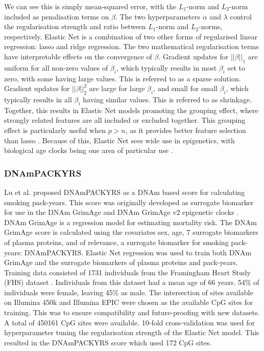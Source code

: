 \documentclass[draft]{article} %
\begin{document}
We can see this is simply mean-squared error, with the \(L_1\)-norm and \(L_2\)-norm included as penalisation terms on \(\beta\). The two hyperparameters \(\alpha\) and \(\lambda\) control the regularisation strength and ratio between \(L_1\)-norm and \(L_2\)-norms, respectively. Elastic Net is a combination of two other forms of regularised linear regression: lasso \cite{tibshirani1996regression} and ridge \cite{hoerl1970ridge} regression. The two mathematical regularisation terms have interpretable effects on the convergence of \(\beta\). Gradient updates for \(||\beta||_1\) are uniform for all non-zero values of \(\beta_i\), which typically results in most \(\beta_i\) set to zero, with some having large values. This is referred to as a sparse solution. Gradient updates for \(||\beta||_2^2\) are large for large \(\beta_i\), and small for small \(\beta_i\), which typically results in all \(\beta_i\) having similar values. This is referred to as shrinkage. Together, this results in Elastic Net models promoting the grouping effect, where strongly related features are all included or excluded together. This grouping effect is particularly useful when \(p > n\), as it provides better feature selection than lasso \cite{zou2005regularization}. Because of this, Elastic Net sees wide use in epigenetics, with biological age clocks being one area of particular use \cite{teschendorff2025epigenetic}.

\subsubsection{DNAmPACKYRS} \label{sec:dnampackyrs}
Lu et al. \cite{lu2019dna} proposed DNAmPACKYRS as a DNAm based score for calculating smoking pack-years. This score was originally developed as surrogate biomarker for use in the DNAm GrimAge \cite{lu2019dna} and DNAm GrimAge v2 epigenetic clocks \cite{lu2022dna}. DNAm GrimAge is a regression model for estimating mortality risk. The DNAm GrimAge score is calculated using the covariates sex, age, 7 surrogate biomarkers of plasma proteins, and of relevance, a surrogate biomarker for smoking pack-years: DNAmPACKYRS. Elastic Net regression was used to train both DNAm GrimAge and the surrogate biomarkers of plasma proteins and pack-years. Training data consisted of 1731 individuals from the Framingham Heart Study (FHS) dataset \cite{doi:10.2105/AJPH.41.3.279}. Individuals from this dataset had a mean age of 66 years. 54\% of individuals were female, leaving 45\% as male. The intersection of sites available on Illumina 450k and Illumina EPIC were chosen as the available CpG sites for training. This was to ensure compatibility and future-proofing with new datasets. A total of \num{450161} CpG sites were available. 10-fold cross-validation was used for hyperparameter tuning the regularisation strength of the Elastic Net model. This resulted in the DNAmPACKYRS score which used 172 CpG sites.
\end{document}
